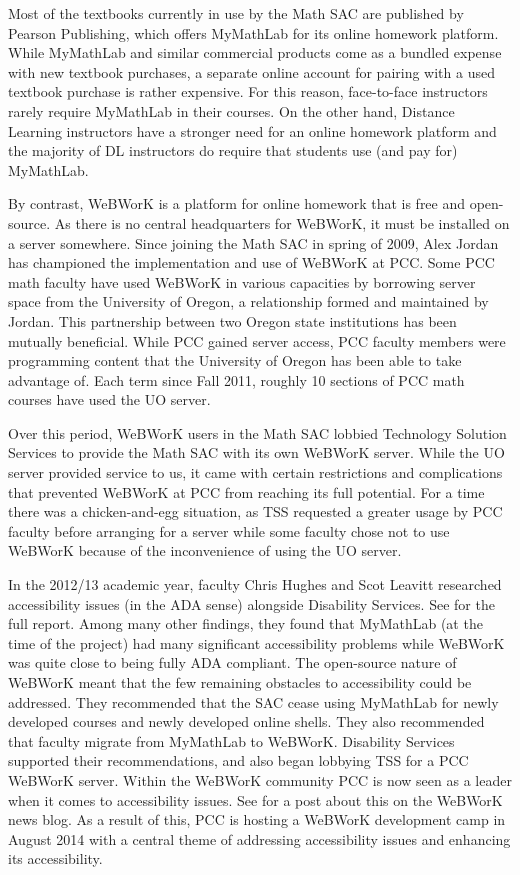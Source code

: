 Most of the textbooks currently in use by the Math SAC are published by Pearson
Publishing, which offers MyMathLab for its online homework platform. While
MyMathLab and similar commercial products come as a bundled expense with new
textbook purchases, a separate online account for pairing with a used textbook
purchase is rather expensive. For this reason, face-to-face instructors rarely
require MyMathLab in their courses. On the other hand, Distance Learning
instructors have a stronger need for an online homework platform and the
majority of DL instructors do require that students use (and pay for) MyMathLab.

By contrast, WeBWorK is a platform for online homework that is free and
open-source. As there is no central headquarters for WeBWorK, it must be
installed on a server somewhere. Since joining the Math SAC in spring of 2009,
Alex Jordan has championed the implementation and use of WeBWorK at PCC. Some
PCC math faculty have used WeBWorK in various capacities by borrowing server
space from the University of Oregon, a relationship formed and maintained by
Jordan. This partnership between two Oregon state institutions has been
mutually beneficial. While PCC gained server access, PCC faculty members were
programming content that the University of Oregon has been able to take advantage of. Each term since
Fall 2011, roughly 10 sections of PCC math courses have used the UO server.

Over this period, WeBWorK users in the Math SAC lobbied Technology Solution
Services to provide the Math SAC with its own WeBWorK server. While the UO
server provided service to us, it came with certain restrictions and
complications that prevented WeBWorK at PCC from reaching its full potential.
For a time there was a chicken-and-egg situation, as TSS requested a greater
usage by PCC faculty before arranging for a server while some faculty chose not
to use WeBWorK because of the inconvenience of using the UO server.

In the 2012/13 academic year, faculty Chris Hughes and Scot Leavitt researched
accessibility issues (in the ADA sense) alongside Disability Services. See
\cite{accessibilityproject} for the full report. Among many other findings, they
found that MyMathLab (at the time of the project) had many significant
accessibility problems while WeBWorK was quite close to being fully ADA
compliant. The open-source nature of WeBWorK meant that the few remaining
obstacles to accessibility could be addressed. They recommended that the SAC
cease using MyMathLab for newly developed courses and newly developed online
shells. They also recommended that faculty migrate from MyMathLab to WeBWorK.
Disability Services supported their recommendations, and also began lobbying TSS
for a PCC WeBWorK server. Within the WeBWorK community PCC is now seen as a
leader when it comes to accessibility issues. See \cite{webworkblog} for a post
about this on the WeBWorK news blog. As a result of this, PCC is hosting a
WeBWorK development camp in August 2014 with a central theme of addressing
accessibility issues and enhancing its accessibility.\label{other:page:disabilityservices}

